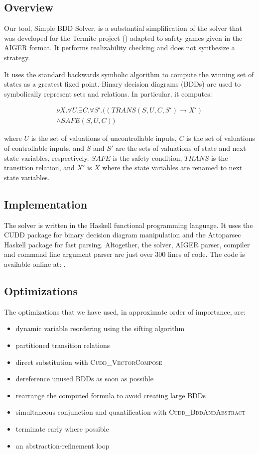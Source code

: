 \subsection{Overview}
Our tool, Simple BDD Solver, is a substantial simplification of the solver that was developed for the Termite project () adapted to safety games given in the AIGER format. 
It performs realizability checking and does not synthesize a strategy.

It uses the standard backwards symbolic algorithm to compute the winning set of states as a greatest fixed point. Binary decision diagrams (BDDs) are used to symbolically represent sets and relations. In particular, it computes:

\begin{multline}
\label{eqn:mu}
\nu X. \forall U. \exists C. \forall S'. ((TRANS(S, U, C, S') \rightarrow X') \\ \wedge SAFE(S, U, C))
\end{multline}

\noindent where $U$ is the set of valuations of uncontrollable inputs, $C$ is the set of valuations of controllable inputs, and $S$ and $S'$ are the sets of valuations of state and next state variables, respectively. $SAFE$ is the safety condition, $TRANS$ is the transition relation, and $X'$ is $X$ where the state variables are renamed to next state variables.

\subsection{Implementation}
The solver is written in the Haskell functional programming language. It uses the CUDD \cite{cudd} package for binary decision diagram manipulation and the Attoparsec \cite{attoparsec} Haskell package for fast parsing. Altogether, the solver, AIGER parser, compiler and command line argument parser are just over 300 lines of code. The code is available online at: .

\subsection{Optimizations}

The optimizations that we have used, in approximate order of importance, are:
\begin{itemize}
    \item dynamic variable reordering using the sifting algorithm \cite{sifting}
    \item partitioned transition relations \cite{partitioned}
    \item direct substitution with \textsc{Cudd\_VectorCompose}
    \item dereference unused BDDs as soon as possible
    \item rearrange the computed formula to avoid creating large BDDs
    \item simultaneous conjunction and quantification with \textsc{Cudd\_BddAndAbstract}
    \item terminate early where possible
    \item an abstraction-refinement loop
\end{itemize}

